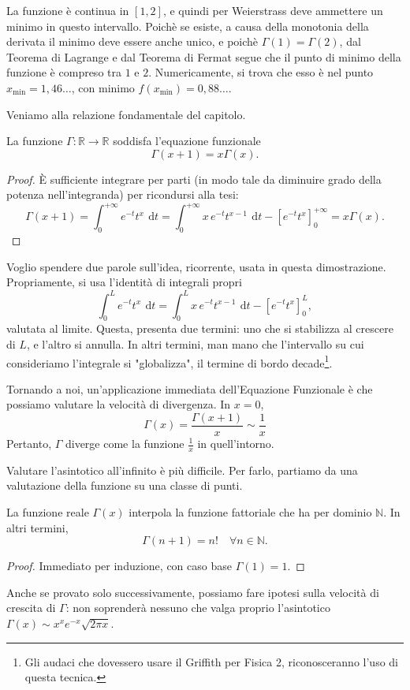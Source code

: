 La funzione è continua in $[1,2]$, e quindi per Weierstrass deve ammettere un minimo in questo intervallo. Poichè se esiste, a causa della monotonia della derivata il minimo deve essere anche unico, e poichè $\Gamma(1)=\Gamma(2)$, dal Teorema di Lagrange e dal Teorema di Fermat segue che il punto di minimo della funzione è compreso tra $1$ e $2$. Numericamente, si trova che esso è nel punto $x_{\min}=1,46\dots$, con minimo $f(x_{\min})=0,88\dots$.

Veniamo alla relazione fondamentale del capitolo. 
\begin{Res}
	La funzione $\Gamma: \mathbb{R} \to \mathbb{R}$ soddisfa l'equazione funzionale
	\[
		\Gamma(x+1)=x\Gamma(x).
	\]
\end{Res}
\begin{proof}
	È sufficiente integrare per parti (in modo tale da diminuire grado della potenza nell'integranda) per ricondursi alla tesi:
	\[
		\Gamma(x+1)=\int^{+\infty}_0 e^{-t}t^x \:\,\mathrm{d}t =
		\int^{+\infty}_0 x \, e^{-t}t^{x-1} \:\,\mathrm{d}t - \left[e^{-t}t^x\right]^{+\infty}_0 =
		x\Gamma(x).
	\]
\end{proof}
Voglio spendere due parole sull'idea, ricorrente, usata in questa dimostrazione. Propriamente, si usa l'identità di integrali propri
\[
	\int^L_0 e^{-t}t^x \:\,\mathrm{d}t = \int^L_0 x \, e^{-t}t^{x-1} \:\,\mathrm{d}t - \left[e^{-t}t^x\right]^L_0,
\]
valutata al limite. Questa, presenta due termini: uno che si stabilizza al crescere di $L$, e l'altro si annulla. In altri termini, man mano che l'intervallo su cui consideriamo l'integrale si "globalizza", il termine di bordo decade\footnote{Gli audaci che dovessero usare il Griffith per Fisica 2, riconosceranno l'uso di questa tecnica.}.

Tornando a noi, un'applicazione immediata dell'Equazione Funzionale è che possiamo valutare la velocità di divergenza.
In $x=0$,
\[
	\Gamma(x)=\frac{\Gamma(x+1)}{x}\sim\frac{1}{x}
\]
Pertanto, $\Gamma$ diverge come la funzione $\frac{1}{x}$ in quell'intorno. 

Valutare l'asintotico all'infinito è più difficile. Per farlo, partiamo da una valutazione della funzione su una classe di punti.

\begin{Res} 
	La funzione reale $\Gamma(x)$ interpola la funzione fattoriale che ha per dominio $\mathbb{N}$. In altri termini,
	\[
		\Gamma(n+1)=n!\quad\forall n\in\mathbb{N}.
	\]
\end{Res}
\begin{proof}
	Immediato per induzione, con caso base $\Gamma(1)=1$.
\end{proof}
Anche se provato solo successivamente, possiamo fare ipotesi sulla velocità di crescita di $\Gamma$: non soprenderà nessuno che valga proprio l'asintotico $\Gamma(x)\sim x^x e^{-x}\sqrt{2\pi x}$.


